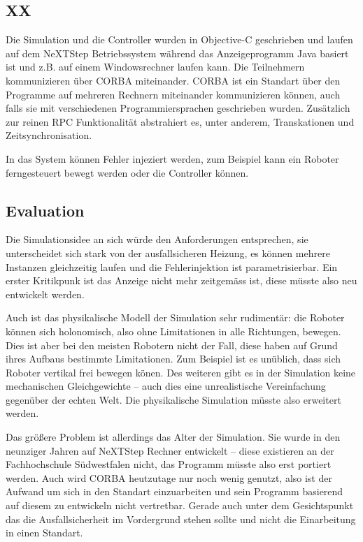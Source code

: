 \subsection{XX}
Die Simulation und die Controller wurden in Objective-C geschrieben und laufen auf dem NeXTStep Betriebssystem w{\"{a}}hrend das Anzeigeprogramm Java basiert ist und z.B. auf
einem Windowsrechner laufen kann. Die Teilnehmern kommunizieren {\"{u}}ber CORBA miteinander\cite{predictablecorba}. CORBA ist ein Standart {\"{u}}ber den Programme auf
mehreren Rechnern miteinander kommunizieren k{\"{o}}nnen, auch falls sie mit verschiedenen Programmiersprachen geschrieben wurden. Zus{\"{a}}tzlich zur reinen RPC
Funktionalit{\"{a}}t abstrahiert es, unter anderem, Transkationen und Zeitsynchronisation.

In das System k{\"{o}}nnen Fehler injeziert werden, zum Beispiel kann ein Roboter ferngesteuert bewegt werden oder die Controller k{\"{o}}nnen. \todo{}

\subsection{Evaluation} 
Die Simulationsidee an sich w{\"{u}}rde den Anforderungen entsprechen, sie unterscheidet sich stark von der ausfallsicheren Heizung, es k{\"{o}}nnen mehrere Instanzen
gleichzeitig laufen und die Fehlerinjektion ist parametrisierbar. Ein erster Kritikpunk ist das Anzeige nicht mehr zeitgem{\"{a}}ss ist, diese m{\"{u}}sste also neu
entwickelt werden.

Auch ist das physikalische Modell der Simulation sehr rudiment{\"{a}}r: die Roboter k{\"{o}}nnen sich holonomisch, also ohne Limitationen in alle Richtungen,
bewegen. Dies ist aber bei den meisten Robotern nicht der Fall, diese haben auf Grund ihres Aufbaus bestimmte Limitationen. Zum Beispiel ist es un{\"{u}}blich, dass sich
Roboter vertikal frei bewegen k{\"{o}}nen. Des weiteren gibt es in der Simulation keine mechanischen Gleichgewichte -- auch dies eine unrealistische
Vereinfachung gegen{\"{u}}ber der echten Welt. Die physikalische Simulation m{\"{u}}sste also erweitert werden.

Das gr{\"{o}}{\ss}ere Problem ist allerdings das Alter der Simulation. Sie wurde in den neunziger Jahren auf NeXTStep Rechner entwickelt -- diese existieren an der
Fachhochschule S{\"{u}}dwestfalen nicht, das Programm m{\"{u}}sste also erst portiert werden. Auch wird CORBA heutzutage nur noch wenig genutzt, also ist der Aufwand
um sich in den Standart einzuarbeiten und sein Programm basierend auf diesem zu entwickeln nicht vertretbar. Gerade auch unter dem Gesichtspunkt das die Ausfallsicherheit
im Vordergrund stehen sollte und nicht die Einarbeitung in einen Standart.

